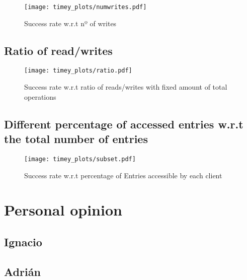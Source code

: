 \documentclass[a4paper, 10pt]{article}
\begin{document}
\begin{figure}[H]
  \centering
  \texttt{[image: timey\_plots/numwrites.pdf]}
    \caption{Success rate w.r.t nº of writes}
    \label{timey:numwrites}
\end{figure} 

\subsection{Ratio of read/writes}

\begin{figure}[H]
  \centering
  \texttt{[image: timey\_plots/ratio.pdf]}
    \caption{Success rate w.r.t ratio of reads/writes with fixed amount of total operations}
    \label{timey:ratio}
\end{figure} 

\subsection{Different percentage of accessed entries w.r.t the total number of entries}

\begin{figure}[H]
  \centering
  \texttt{[image: timey\_plots/subset.pdf]}
    \caption{Success rate w.r.t percentage of Entries accessible by each client}
    \label{timey:subset}
\end{figure} 

\clearpage
\section{Personal opinion}

\subsection{Ignacio}

\subsection{Adrián}
\end{document}
